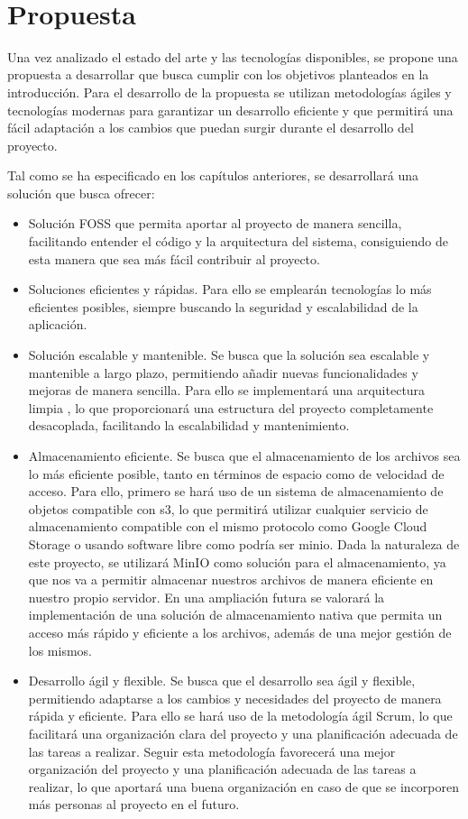 \newpage
~
\newpage
\chapter{Propuesta}
Una vez analizado el estado del arte y las tecnologías disponibles, se propone una propuesta a desarrollar que busca cumplir con los objetivos planteados en la introducción. Para el desarrollo de la propuesta se utilizan metodologías ágiles y tecnologías modernas para garantizar un desarrollo eficiente y que permitirá una fácil adaptación a los cambios que puedan surgir durante el desarrollo del proyecto.

Tal como se ha especificado en los capítulos anteriores, se desarrollará una solución que busca ofrecer:
\begin{itemize}
    \item Solución FOSS que permita aportar al proyecto de manera sencilla, facilitando entender el código y la arquitectura del sistema, consiguiendo de esta manera que sea más fácil contribuir al proyecto.
    \item Soluciones eficientes y rápidas. Para ello se emplearán tecnologías lo más eficientes posibles, siempre buscando la seguridad y escalabilidad de la aplicación.
    \item Solución escalable y mantenible. Se busca que la solución sea escalable y mantenible a largo plazo, permitiendo añadir nuevas funcionalidades y mejoras de manera sencilla. Para ello se implementará una arquitectura limpia \parencite{uncle-bob-clean-architecture}, lo que proporcionará una estructura del proyecto completamente desacoplada, facilitando la escalabilidad y mantenimiento.
    \item Almacenamiento eficiente. Se busca que el almacenamiento de los archivos sea lo más eficiente posible, tanto en términos de espacio como de velocidad de acceso.
        Para ello, primero se hará uso de un sistema de almacenamiento de objetos compatible con \gls{s3}, lo que permitirá utilizar cualquier servicio de almacenamiento compatible con el mismo protocolo como Google Cloud Storage o usando software libre como podría ser \gls{minio}.
        Dada la naturaleza de este proyecto, se utilizará MinIO como solución para el almacenamiento, ya que nos va a permitir almacenar nuestros archivos de manera eficiente en nuestro propio servidor.
        En una ampliación futura se valorará la implementación de una solución de almacenamiento nativa que permita un acceso más rápido y eficiente a los archivos, además de una mejor gestión de los mismos.
    \item Desarrollo ágil y flexible. Se busca que el desarrollo sea ágil y flexible, permitiendo adaptarse a los cambios y necesidades del proyecto de manera rápida y eficiente. Para ello se hará uso de la metodología ágil Scrum, lo que facilitará una organización clara del proyecto y una planificación adecuada de las tareas a realizar.
        Seguir esta metodología favorecerá una mejor organización del proyecto y una planificación adecuada de las tareas a realizar, lo que aportará una buena organización en caso de que se incorporen más personas al proyecto en el futuro.
\end{itemize}

